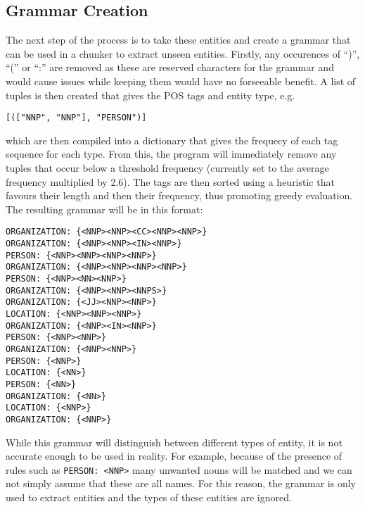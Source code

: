 \documentclass[draft]{article}
\begin{document}
\begin{multicols*}{2}
\section*{Grammar Creation}
The next step of the process is to take these entities and create a grammar that can be used in a chunker \citep{NLPChunker} to extract unseen entities. Firstly, any occurences of ``)'', ``('' or ``:'' are removed as these are reserved characters for the grammar and would cause issues while keeping them would have no forseeable benefit. A list of tuples is then created that gives the POS tags and entity type, e.g. \begin{verbatim}[(["NNP", "NNP"], "PERSON")]\end{verbatim} which are then compiled into a dictionary that gives the frequecy of each tag sequence for each type. From this, the program will immediately remove any tuples that occur below a threshold frequency (currently set to the average frequency multiplied by 2.6). The tags are then sorted using a heuristic that favours their length and then their frequency, thus promoting greedy evaluation. The resulting grammar will be in this format:
\begin{verbatim}
ORGANIZATION: {<NNP><NNP><CC><NNP><NNP>}
ORGANIZATION: {<NNP><NNP><IN><NNP>}
PERSON: {<NNP><NNP><NNP><NNP>}
ORGANIZATION: {<NNP><NNP><NNP><NNP>}
PERSON: {<NNP><NN><NNP>}
ORGANIZATION: {<NNP><NNP><NNPS>}
ORGANIZATION: {<JJ><NNP><NNP>}
LOCATION: {<NNP><NNP><NNP>}
ORGANIZATION: {<NNP><IN><NNP>}
PERSON: {<NNP><NNP>}
ORGANIZATION: {<NNP><NNP>}
PERSON: {<NNP>}
LOCATION: {<NN>}
PERSON: {<NN>}
ORGANIZATION: {<NN>}
LOCATION: {<NNP>}
ORGANIZATION: {<NNP>}
\end{verbatim}

While this grammar will distinguish between different types of entity, it is not accurate enough to be used in reality. For example, because of the presence of rules such as \texttt{PERSON: {<NNP>}} many unwanted nouns will be matched and we can not simply assume that these are all names. For this reason, the grammar is only used to extract entities and the types of these entities are ignored.


\end{multicols*}
\end{document}
